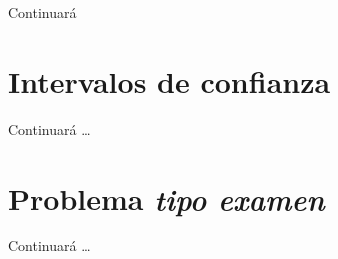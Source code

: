 \documentclass[
  notoc,
  nobib,
  degree=mec]{mnye}
\begin{document}
Continuará

\hypertarget{conf-int}{%
\section{Intervalos de confianza}\label{conf-int}}

Continuará \ldots{}

\nocite{Milton2003}
\nocite{Montgomery2010}

\makeatletter
\renewcommand{\mybibnote@contents}{%
Para ampliar conocimientos de este tema puedes consultar los Capítulos 6, 7, 8 y 9   de  \cite{Milton2003} y los Capítulos 6, 7, 8 y 9 de \cite{Montgomery2010}. 
}
\makeatother

\cleardoublepage

\hypertarget{problema-tipo-examen}{%
\section*{\texorpdfstring{Problema \emph{tipo examen}}{Problema tipo examen}}\label{problema-tipo-examen}}

Continuará \ldots{}

\cleardoublepage

\printbibliography

%
\end{document}

